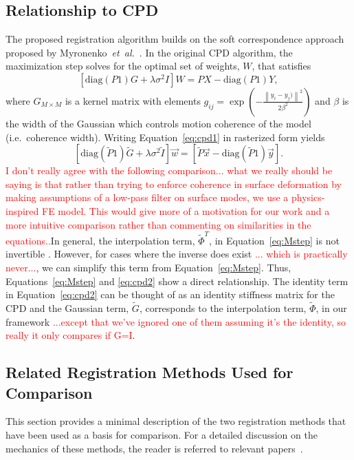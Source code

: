 \documentclass[journal]{IEEEtran}
\newcommand{\comment}[1]{\textcolor{red}{#1}}
\newcommand{\trans}[1]{#1^{\scriptscriptstyle T}}
\newcommand{\diag}{\mathrm{diag}}
\begin{document}
\subsection{Relationship to CPD}
The proposed registration algorithm builds on the soft correspondence approach proposed by Myronenko~\textit{et~al.}~\cite{Myronenko10a}. In the original CPD algorithm, the maximization step solves for the optimal set of weights, $W$, that satisfies
\begin{equation} \label{eq:cpd1}
\left[\diag(P1)G + \lambda\sigma^2I\right]W = PX - \diag\left(P1\right)Y,
\end{equation}
where $G_{M \times M}$ is a kernel matrix with elements $g_{ij}=\exp{\left(-\frac{\left\|y_i- y_j)\right\|^2}{2\beta^2}\right)}$ and $\beta$ is the width of the Gaussian which controls motion coherence of the model (i.e.~coherence width). Writing Equation~\eqref{eq:cpd1} in rasterized form yields
\begin{equation} \label{eq:cpd2}
\left[\diag(\tilde{P}1)\tilde{G} + \lambda\sigma^2\tilde{I}\right]\vec{w} = [\tilde{P}\vec{x} - \diag\left(\tilde{P}1\right)\vec{y}].
\end{equation}
\comment{I don't really agree with the following comparison... what we really should be saying is that rather than trying to enforce coherence in surface deformation by making assumptions of a low-pass filter on surface modes, we use a physics-inspired FE model.  This would give more of a motivation for our work and a more intuitive comparison rather than commenting on similarities in the equations..}In general, the interpolation term, $\trans{\tilde{\Phi}}$, in Equation~\eqref{eq:Mstep} is not invertible . However, for cases where the inverse does exist \comment{... which is practically never...}, we can simplify this term from Equation~\eqref{eq:Mstep}. Thus, Equations~\eqref{eq:Mstep} and \eqref{eq:cpd2} show a direct relationship. The identity term in Equation~\eqref{eq:cpd2} can be thought of as an identity stiffness matrix for the CPD and the Gaussian term, $\tilde{G}$, corresponds to the interpolation term, $\tilde{\Phi}$, in our framework \comment{...except that we've ignored one of them assuming it's the identity, so really it only compares if G=I}.
\subsection{Related Registration Methods Used for Comparison}
This section provides a minimal description of the two registration methods that have been used as a basis for comparison. For a detailed discussion on the mechanics of these methods, the reader is referred to relevant papers~\cite{Chui03a,Ferrant01a}.
\end{document}
